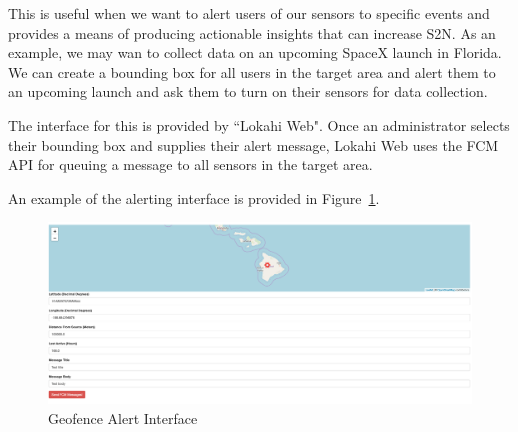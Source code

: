 This is useful when we want to alert users of our sensors to specific events and provides a means of producing actionable insights that can increase S2N. As an example, we may wan to collect data on an upcoming SpaceX launch in Florida. We can create a bounding box for all users in the target area and alert them to an upcoming launch and ask them to turn on their sensors for data collection.

The interface for this is provided by ``Lokahi Web". Once an administrator selects their bounding box and supplies their alert message, Lokahi Web uses the FCM API for queuing a message to all sensors in the target area.

An example of the alerting interface is provided in Figure~\ref{fig:fcm}.

\begin{figure}
	\centering
	\includegraphics[width=\linewidth]{figures/fcm.png}
	\caption{Geofence Alert Interface}
	\label{fig:fcm}
\end{figure}
